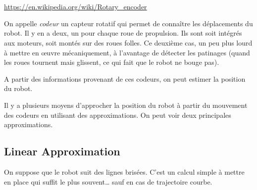 \documentclass[11pt]{article}
\begin{document}
%
%
%


    \section{}

     \href{https://en.wikipedia.org/wiki/Rotary\_encoder}{https://en.wikipedia.org/wiki/Rotary\_encoder}


    On appelle \emph{codeur} un capteur rotatif qui permet de connaître les déplacements du robot. Il y en a deux, un pour chaque roue de propulsion. Ils sont soit intégrés aux moteurs, soit montés sur des roues folles. Ce deuxième cas, un peu plus lourd à mettre en œuvre mécaniquement, à l'avantage de détecter les patinages (quand les roues tournent mais glissent, ce qui fait que le robot ne bouge pas).

    A partir des informations provenant de ces codeurs, on peut estimer la position du robot.

    Il y a plusieurs moyens d'approcher la position du robot à partir du mouvement des codeurs en utilisant des approximations. On peut voir deux principales approximations.

    \subsection{Linear Approximation}\label{subsec:linearApproximation}

    On suppose que le robot suit des lignes brisées. C'est un calcul simple à mettre en place qui suffit le plus souvent… sauf en cas de trajectoire courbe.
\end{document}
